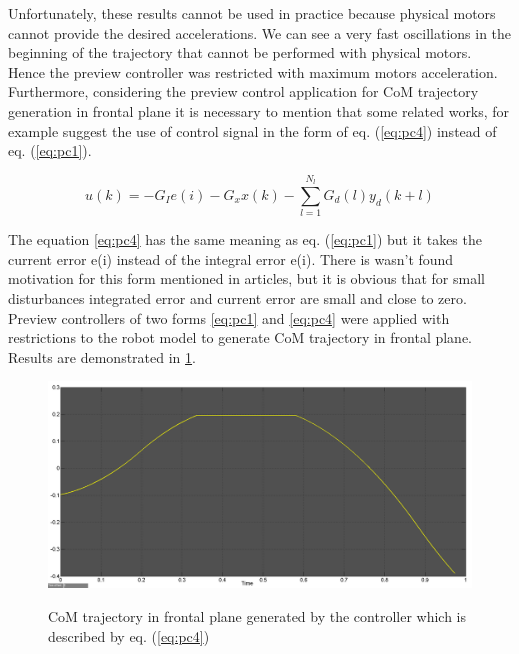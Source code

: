 \documentclass[12pt,a4paper]{report}
\begin{document}
			Unfortunately, these results cannot be used in practice because physical motors cannot provide the desired accelerations. We can see a very fast oscillations in the beginning of the trajectory that cannot be performed with physical motors. Hence the preview controller was restricted with maximum motors acceleration.\\
		
			Furthermore, considering the preview control application for CoM trajectory generation in frontal plane it is necessary to mention that some related works, for example \cite{choi2006fuzzy} suggest the use of control signal in the form of eq. (\ref{eq:pc4}) instead of eq. (\ref{eq:pc1}).
			
			\begin{equation}\label{eq:pc4}
				u(k) = -G_I e(i) - G_xx(k) - \sum^{N_l}_{l=1}G_d(l)y_d(k+l)
			\end{equation}
			
			The equation \ref{eq:pc4} has the same meaning as eq. (\ref{eq:pc1}) but it takes the current error e(i) instead of the integral error e(i). There is wasn't found motivation for this form mentioned in articles, but it is obvious that for small disturbances integrated error and current error are small and close to zero. Preview controllers of two forms \ref{eq:pc1} and \ref{eq:pc4} were applied with restrictions to the robot model to generate CoM trajectory in frontal plane. Results are demonstrated in \cref{fig:22}.

		 	\begin{figure}[H]
		 		\vspace{-0.2cm}
		 		\centering
		 		{\includegraphics[width=1\textwidth]{22}}
		 		\caption{CoM trajectory in frontal plane generated by the controller which is described by eq. (\ref{eq:pc4})}
		 		\label{fig:22}
		 		\vspace{-0.1cm}
		 	\end{figure}
		 	
\end{document}

